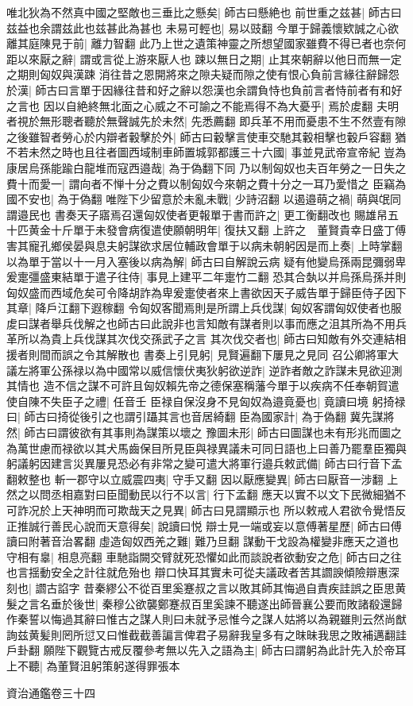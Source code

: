 唯北狄為不然真中國之堅敵也三垂比之懸矣|{
	師古曰懸絶也}
前世重之兹甚|{
	師古曰兹益也余謂兹此也兹甚此為甚也}
未易可輕也|{
	易以豉翻}
今單于歸義懷欵誠之心欲離其庭陳見于前|{
	離力智翻}
此乃上世之遺策神靈之所想望國家雖費不得已者也奈何距以來厭之辭|{
	謂或言從上游來厭人也}
踈以無日之期|{
	止其來朝辭以他日而無一定之期則匈奴與漢踈}
消往昔之恩開將來之隙夫疑而隙之使有恨心負前言緣往辭歸怨於漢|{
	師古曰言單于因緣往昔和好之辭以怨漢也余謂負恃也負前言者恃前者有和好之言也}
因以自絶終無北面之心威之不可諭之不能焉得不為大憂乎|{
	焉於䖍翻}
夫明者視於無形聰者聽於無聲誠先於未然|{
	先悉薦翻}
即兵革不用而憂患不生不然壹有隙之後雖智者勞心於内辯者轂擊於外|{
	師古曰轂擊言使車交馳其轂相擊也轂戶容翻}
猶不若未然之時也且往者圖西域制車師置城郭都護三十六國|{
	事並見武帝宣帝紀}
豈為康居烏孫能踰白龍堆而寇西邉哉|{
	為于偽翻下同}
乃以制匈奴也夫百年勞之一日失之費十而愛一|{
	謂向者不惮十分之費以制匈奴今來朝之費十分之一耳乃愛惜之}
臣竊為國不安也|{
	為于偽翻}
唯陛下少留意於未亂未戰|{
	少詩沼翻}
以遏邉萌之禍|{
	萌與氓同謂邉民也}
書奏天子寤焉召還匈奴使者更報單于書而許之|{
	更工衡翻改也}
賜雄帠五十匹黄金十斤單于未發會病復遣使願朝明年|{
	復扶又翻}
上許之　董賢貴幸日盛丁傅害其寵孔鄉侯晏與息夫躬謀欲求居位輔政會單于以病未朝躬因是而上奏|{
	上時掌翻}
以為單于當以十一月入塞後以病為解|{
	師古曰自解說云病}
疑有他變烏孫兩昆彌弱卑爰疐彊盛東結單于遣子往侍|{
	事見上建平二年疐竹二翻}
恐其合埶以并烏孫烏孫并則匈奴盛而西域危矣可令降胡詐為卑爰疐使者來上書欲因天子威告單于歸臣侍子因下其章|{
	降戶江翻下遐稼翻}
令匈奴客聞焉則是所謂上兵伐謀|{
	匈奴客謂匈奴使者也服䖍曰謀者舉兵伐解之也師古曰此說非也言知敵有謀者則以事而應之沮其所為不用兵革所以為貴上兵伐謀其次伐交孫武子之言}
其次伐交者也|{
	師古曰知敵有外交連結相援者則間而誤之令其解散也}
書奏上引見躬|{
	見賢遍翻下屢見之見同}
召公卿將軍大議左將軍公孫禄以為中國常以威信懷伏夷狄躬欲逆詐|{
	逆詐者敵之詐謀未見欲迎測其情也}
造不信之謀不可許且匈奴賴先帝之德保塞稱藩今單于以疾病不任奉朝賀遣使自陳不失臣子之禮|{
	任音壬}
臣禄自保沒身不見匈奴為邉竟憂也|{
	竟讀曰境}
躬掎禄曰|{
	師古曰掎從後引之也謂引躡其言也音居綺翻}
臣為國家計|{
	為于偽翻}
冀先謀將然|{
	師古曰謂彼欲有其事則為謀策以壞之}
豫圖未形|{
	師古曰圖謀也未有形兆而圖之}
為萬世慮而禄欲以其犬馬齒保目所見臣與禄異議未可同日語也上曰善乃罷羣臣獨與躬議躬因建言災異屢見恐必有非常之變可遣大將軍行邉兵敕武備|{
	師古曰行音下孟翻敕整也}
斬一郡守以立威震四夷|{
	守手又翻}
因以厭應變異|{
	師古曰厭音一涉翻}
上然之以問丞相嘉對曰臣聞動民以行不以言|{
	行下孟翻}
應天以實不以文下民微細猶不可詐况於上天神明而可欺哉天之見異|{
	師古曰見謂顯示也}
所以敕戒人君欲令覺悟反正推誠行善民心說而天意得矣|{
	說讀曰悦}
辯士見一端或妄以意傅著星歷|{
	師古曰傅讀曰附著音治畧翻}
虛造匈奴西羌之難|{
	難乃旦翻}
謀動干戈設為權變非應天之道也守相有辠|{
	相息亮翻}
車馳詣闕交臂就死恐懼如此而談說者欲動安之危|{
	師古曰之往也言揺動安全之計往就危殆也}
辯口快耳其實未可從夫議政者苦其讇諛傾險辯惠深刻也|{
	讇古諂字}
昔秦繆公不從百里奚蹇叔之言以敗其師其悔過自責疾詿誤之臣思黄髮之言名垂於後世|{
	秦穆公欲襲鄭蹇叔百里奚諫不聽遂出師晉襄公要而敗諸殽還歸作秦誓以悔過其辭曰惟古之謀人則曰未就予忌惟今之謀人姑將以為親雖則云然尚猷詢兹黄髪則罔所愆又曰惟截截善諞言俾君子易辭我皇多有之昩昧我思之敗補邁翻詿戶卦翻}
願陛下觀覽古戒反覆參考無以先入之語為主|{
	師古曰謂躬為此計先入於帝耳}
上不聽|{
	為董賢沮躬策躬遂得罪張本}


資治通鑑卷三十四
